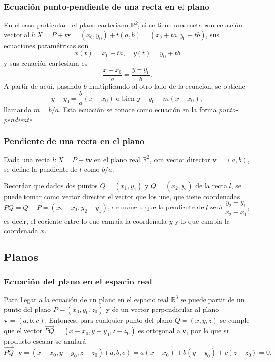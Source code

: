 \begin{frame}
\frametitle{Ecuación punto-pendiente de una recta en el plano}
En el caso particular del plano cartesiano $\mathbb{R^2}$, si se tiene una recta con ecuación vectorial $l: X=P+t\mathbf{v}=(x_0,y_0)+t(a,b)
= (x_0+ta,y_0+tb)$, sus ecuaciones paramétricas son
\[
x(t)=x_0+ta,\quad y(t)=y_0+tb
\]
y sus ecuación cartesiana es
\[
\frac{x-x_0}{a} = \frac{y-y_0}{b}.
\]  
A partir de aquí, pasando $b$ multiplicando al otro lado de la ecuación, se obtiene 
\[
y-y_0 = \frac{b}{a}(x-x_0) \mbox{ o bien } y-y_0+m(x-x_0),
\]
llamando $m=b/a$. Esta ecuación se conoce como ecuación en la forma \emph{punto-pendiente}.
 
\end{frame} 


\begin{frame}
\frametitle{Pendiente de una recta en el plano}
\begin{definicion}
Dada una recta $l: X=P+t\mathbf{v}$ en el plano real $\mathbb{R}^2$, con vector director $\mathbf{v}=(a,b)$, se define la pendiente de $l$ como $b/a$.
\end{definicion}

Recordar que dados dos puntos $Q=(x_1,y_1)$ y $Q=(x_2,y_2)$ de la recta $l$, se puede tomar como vector director el vector que los une, que tiene coordenadas $\vec{PQ}=Q-P=(x_2-x_1,y_2-y_1)$, de manera que la pendiente de $l$ será 
$\dfrac{y_2-y_1}{x_2-x_1}$, es decir, el cociente entre lo que cambia la coordenada $y$ y lo que cambia la coordenada $x$.

\begin{center}
\scalebox{0.7}{}
\end{center}
\end{frame} 



\subsection{Planos}
\begin{frame}
\frametitle{Ecuación del plano en el espacio real}
Para llegar a la ecuación de un plano en el espacio real $\mathbb{R}^3$ se puede partir de un punto del plano $P=(x_0,y_0,z_0)$ y de un vector perpendicular al plano $\mathbf{v}=(a,b,c)$. 
Entonces, para cualquier punto del plano $Q=(x,y,z)$ se cumple que el vector $\vec{PQ} = (x-x_0,y-y_0,z-z_0)$ es ortogonal a $\mathbf{v}$, por lo que su producto escalar se anulará
\[
\vec{PQ}\cdot\mathbf{v} = (x-x_0,y-y_0,z-z_0)(a,b,c) = a(x-x_0)+b(y-y_0)+c(z-z_0) = 0.
\]

\begin{center}
\scalebox{0.8}{}
\end{center}
\end{frame} 



